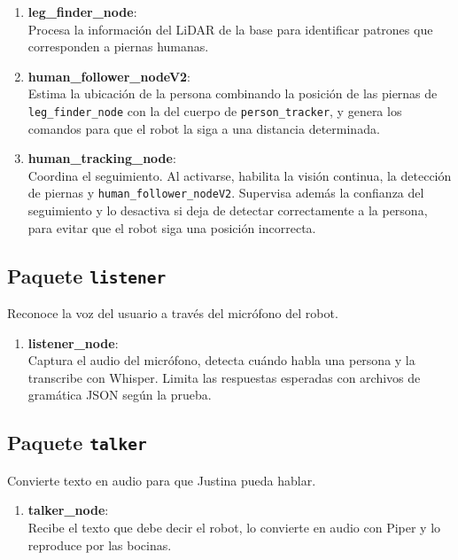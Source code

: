 \begin{enumerate}
    \item \textbf{leg\_finder\_node}: \\
    Procesa la información del LiDAR de la base para identificar patrones que corresponden a piernas humanas.

    \item \textbf{human\_follower\_nodeV2}: \\
    Estima la ubicación de la persona combinando la posición de las piernas de \texttt{leg\_finder\_node} con la del cuerpo de \texttt{person\_tracker}, y genera los comandos para que el robot la siga a una distancia determinada.

    \item \textbf{human\_tracking\_node}: \\
    Coordina el seguimiento. Al activarse, habilita la visión continua, la detección de piernas y \texttt{human\_follower\_nodeV2}. Supervisa además la confianza del seguimiento y lo desactiva si deja de detectar correctamente a la persona, para evitar que el robot siga una posición incorrecta.
\end{enumerate}

\subsection{Paquete \texttt{listener}}
Reconoce la voz del usuario a través del micrófono del robot.

\begin{enumerate}
    \item \textbf{listener\_node}: \\
    Captura el audio del micrófono, detecta cuándo habla una persona y la transcribe con Whisper. Limita las respuestas esperadas con archivos de gramática JSON según la prueba.
\end{enumerate}

\subsection{Paquete \texttt{talker}}
Convierte texto en audio para que Justina pueda hablar.

\begin{enumerate}
    \item \textbf{talker\_node}: \\
    Recibe el texto que debe decir el robot, lo convierte en audio con Piper y lo reproduce por las bocinas.
\end{enumerate}

